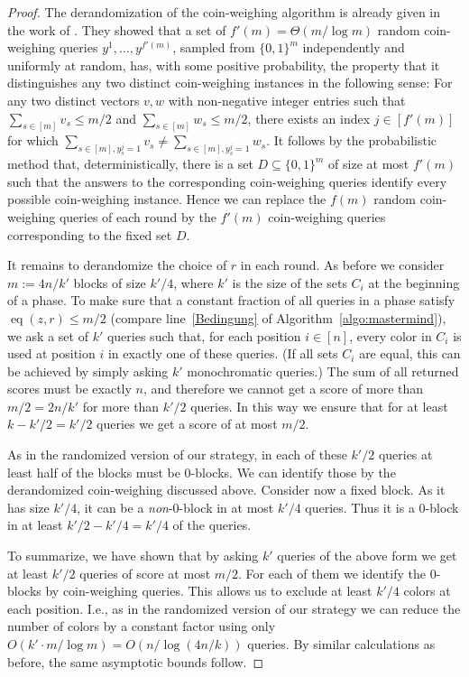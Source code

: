 \documentclass[english,a4paper,11pt]{article}
\DeclareMathOperator{\eq}{eq}
\newcommand{\ifLongCites}[2]{#1}
\newcommand{\ifLongCites}[2]{#2}
\begin{document}
{\begin{proof}
The derandomization of the coin-weighing algorithm is already given in the work of \ifLongCites{\cite{grebinski-journal}}{Grebinski and Kucherov~\cite{grebinski-journal}}. They showed that a set of $f'(m)= \Theta(m/\log m)$ random coin-weighing queries $y^1, \ldots, y^{f'(m)}$, sampled from $\{0,1\}^m$ independently and uniformly at random, has, with some positive probability, the property that it distinguishes any two distinct coin-weighing instances in the following sense: For any two distinct vectors $v, w$ with non-negative integer entries such that $\sum_{s\in[m]}{v_s} \leq m/2$ and $\sum_{s\in[m]}{w_s} \leq m/2$, there exists an index $j\in[f'(m)]$ for which $\sum_{s\in[m],y^j_s=1}{v_s}\neq\sum_{s\in[m],y^j_s=1}{w_s}$.
It follows by the probabilistic method that, deterministically, there is a set $D\subseteq \{0,1\}^m$ of size at most $f'(m)$ such that the answers to the corresponding coin-weighing queries identify every possible coin-weighing instance. Hence we can replace the $f(m)$ random coin-weighing queries of each round by the $f'(m)$ coin-weighing queries corresponding to the fixed set $D$.

It remains to derandomize the choice of $r$ in each round. As before we consider $m:=4n/k'$ blocks of size $k'/4$, where $k'$ is the size of the sets $C_i$ at the beginning of a phase. To make sure that a constant fraction of all queries in a phase satisfy $\eq(z,r)\leq m/2$ (compare line~\ref{Bedingung} of Algorithm~\ref{algo:mastermind}), we ask a set of $k'$ queries such that, for each position $i\in[n]$, every color in $C_i$ is used at position $i$ in exactly one of these queries. (If all sets $C_i$ are equal, this can be achieved by simply asking $k'$ monochromatic queries.) The sum of all returned scores must be exactly $n$, and therefore we cannot get a score of more than $m/2 = 2n/k'$ for more than $k'/2$ queries. In this way we ensure that for at least $k-k'/2=k'/2$ queries we get a score of at most $m/2$.

As in the randomized version of our strategy, in each of these $k'/2$ queries at least half of the blocks must be $0$-blocks. We can identify those by the derandomized coin-weighing discussed above. Consider now a fixed block. As it has size $k'/4$, it can be a \emph{non}-0-block in at most $k'/4$ queries. Thus it is a $0$-block in at least $k'/2-k'/4=k'/4$ of the queries.

To summarize, we have shown that by asking $k'$ queries of the above form we get at least $k'/2$ queries of score at most $m/2$. For each of them we identify the $0$-blocks by coin-weighing queries. This allows us to exclude at least $k'/4$ colors at each position. I.e., as in the randomized version of our strategy we can reduce the number of colors by a constant factor using only $O(k'\cdot m/\log m)=O(n/\log(4n/k))$ queries. By similar calculations as before, the same asymptotic bounds follow. 


\end{proof}}
\end{document}
